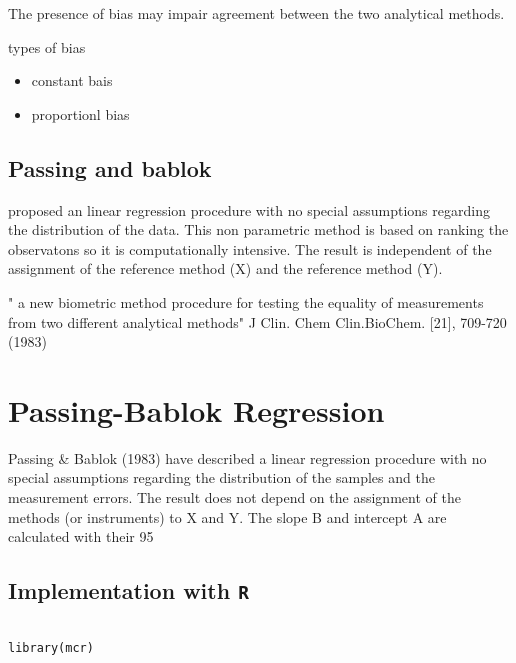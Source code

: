 \documentclass[Chap3amain.tex]{subfiles}
\begin{document}
The presence of bias may impair agreement between the two analytical methods.

types of bias

\begin{itemize}
\item constant bais
\item proportionl bias
\end{itemize}

\subsection{Passing and bablok}
proposed an linear regression procedure with no special assumptions regarding the distribution of the data.
This non parametric method is based on ranking the observatons so it is computationally intensive.
The result is independent of the assignment of the reference method (X) and the reference method (Y).

" a new biometric method procedure for testing the equality of measurements from two different analytical methods"
J Clin. Chem Clin.BioChem. [21], 709-720 (1983)
\section{Passing-Bablok Regression}


Passing & Bablok (1983) have described a linear regression procedure with no special assumptions regarding the distribution of the samples and the measurement errors. The result does not depend on the assignment of the methods (or instruments) to X and Y. The slope B and intercept A are calculated with their 95%

\subsection{Implementation with \texttt{R}}

\begin{framed}
\begin{verbatim}

library(mcr)

\end{verbatim}
\end{framed}
\end{document}

